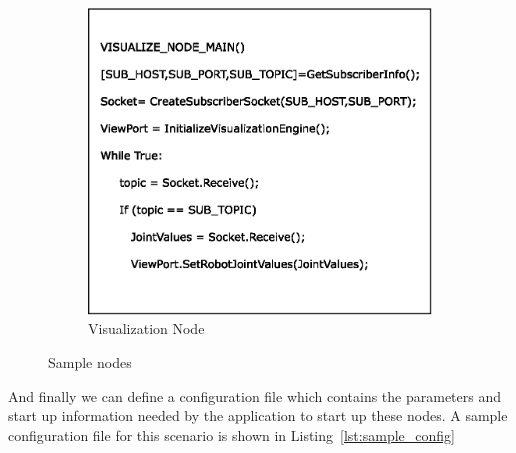 \begin{figure}[H]
\begin{subfigure}[t]{0.48\textwidth}
\includegraphics[width=\textwidth]{assets/sample_node_B.eps}
\caption[Visualization Node]{Visualization Node}
\label{fig:node_b}
\end{subfigure}
\caption[Sample nodes]{Sample nodes}
\label{fig:pseudo_nodes}
\end{figure}
And finally we can define a configuration file which contains the parameters and start up information needed by the application to start up these nodes. A sample configuration file for this scenario is shown in Listing~\ref{lst:sample_config}

